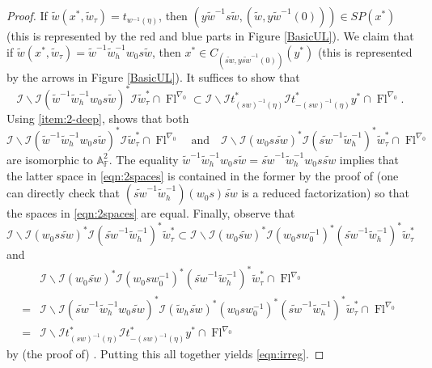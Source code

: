 \documentclass[oneside,a4paper,english, 11pt]{amsart}
\theoremstyle{plain}
\theoremstyle{plain}
\theoremstyle{plain}
\theoremstyle{plain}
\theoremstyle{plain}
\theoremstyle{plain}
\theoremstyle{definition}
\theoremstyle{definition}
\theoremstyle{definition}
\theoremstyle{remark}
\numberwithin{equation}{section}
\newcommand{\F}{\mathbb{F}}
\newcommand{\A}{\mathbb{A}}
\newcommand{\cI}{\mathcal{I}}
\newcommand{\tld}[1]{\widetilde{#1}}
\DeclareMathOperator{\Fl}{Fl}
\begin{document}
\begin{proof}
If $\tld{w}(x^*,\tld{w}_\tau) = t_{w^{-1}(\eta)}$, then $(y\tld{w}^{-1}s\tld{w},(\tld{w},y\tld{w}^{-1}(0))) \in SP(x^*)$ (this is represented by the red and blue parts in Figure \ref{BasicUL}). 
We claim that if $\tld{w}(x^*,\tld{w}_\tau) = \tld{w}^{-1}\tld{w}_h^{-1} w_0 s \tld{w}$, then %
%
$x^*\in C_{(\tld{sw},y\tld{sw}^{-1}(0))}(y^*)$
(this is represented by the arrows in Figure \ref{BasicUL}). 
It suffices to show that 
\begin{equation}\label{eqn:irreg}
\cI \backslash \cI (\tld{w}^{-1}\tld{w}_h^{-1} w_0 s \tld{w})^* \cI \tld{w}_\tau^* \cap \Fl^{\nabla_0} \subset \cI \backslash \cI t_{(sw)^{-1}(\eta)}^* \cI t_{-(sw)^{-1}(\eta)}^* y^* \cap \Fl^{\nabla_0}. 
\end{equation}
%
%
Using \eqref{item:2-deep}, \cite[Theorem 4.2.4]{MLM} shows that both
\begin{equation}
\label{eqn:2spaces} \cI \backslash \cI(\tld{w}^{-1}\tld{w}_h^{-1} w_0 s \tld{w})^* \cI \tld{w}_\tau^* \cap \Fl^{\nabla_0} %
\quad \textrm{and} \quad \cI \backslash \cI(w_0 s \tld{sw})^*\cI (\tld{sw}^{-1}\tld{w}_h^{-1})^* \tld{w}_\tau^* \cap \Fl^{\nabla_0}
\end{equation} 
are isomorphic to $\A^2_{\F}$. 
The equality $\tld{w}^{-1}\tld{w}_h^{-1} w_0 s \tld{w} = \tld{sw}^{-1} \tld{w}_h^{-1} w_0 s \tld{sw}$ implies that the latter space in  \eqref{eqn:2spaces} is contained in the former by the proof of \cite[Proposition 4.3.4]{MLM} (one can directly check that $(\tld{sw}^{-1}\tld{w}_h^{-1}) (w_0 s) \tld{sw}$ is a reduced factorization) so that the spaces in \eqref{eqn:2spaces} are equal. 
Finally, observe that 
\[
\cI \backslash \cI(w_0 s \tld{sw})^*\cI (\tld{sw}^{-1}\tld{w}_h^{-1})^* \tld{w}_\tau^* \subset \cI \backslash \cI(w_0 \tld{sw})^*\cI (w_0 s w_0^{-1})^*(\tld{sw}^{-1}\tld{w}_h^{-1})^* \tld{w}_\tau^*
\] 
and 
\begin{align*}
&\cI \backslash \cI(w_0 \tld{sw})^* \cI(w_0 s w_0^{-1})^*(\tld{sw}^{-1}\tld{w}_h^{-1})^* \tld{w}_\tau^* \cap \Fl^{\nabla_0} \\ = &\cI \backslash \cI(\tld{sw}^{-1} \tld{w}_h^{-1} w_0 \tld{sw})^*\cI (\tld{w}_h \tld{sw})^*(w_0 s w_0^{-1})^*(\tld{sw}^{-1}\tld{w}_h^{-1})^* \tld{w}_\tau^*\cap \Fl^{\nabla_0} \\
=& \cI \backslash \cI t_{(sw)^{-1}(\eta)}^* \cI t_{-(sw)^{-1}(\eta)}^* y^* \cap \Fl^{\nabla_0}
\end{align*} 
by (the proof of) \cite[Proposition 4.3.4]{MLM}. 
Putting this all together yields \eqref{eqn:irreg}. 
%
%

\end{proof}
\end{document}
